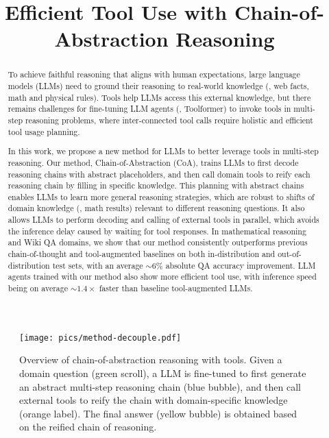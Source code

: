\title{Efficient Tool Use with Chain-of-Abstraction Reasoning}



\maketitle
\renewcommand{\thefootnote}{\fnsymbol{footnote}}
\renewcommand{\thefootnote}{\arabic{footnote}}
\begin{abstract}
To achieve faithful reasoning that aligns with human expectations, large language models (LLMs) need to ground their reasoning to real-world knowledge (\eg{}, web facts, math and physical rules).
Tools help LLMs access this external knowledge, but there remains challenges for fine-tuning LLM agents (\eg{}, Toolformer) to invoke tools in multi-step reasoning problems, where inter-connected tool calls require holistic and efficient tool usage planning.

In this work, we propose a new method for LLMs to better leverage tools in multi-step reasoning.
Our method, Chain-of-Abstraction (CoA), trains LLMs to first decode reasoning chains with abstract placeholders, and then call domain tools to reify each reasoning chain by filling in specific knowledge.
This planning with abstract chains enables LLMs to learn more general reasoning strategies, which are robust to shifts of domain knowledge (\eg{}, math results) relevant to different reasoning questions.
It also allows LLMs to perform decoding and calling of external tools in parallel, which avoids the inference delay caused by waiting for tool responses.
In mathematical reasoning and Wiki QA domains, we show that our method consistently outperforms previous chain-of-thought and tool-augmented baselines on both in-distribution and out-of-distribution test sets, with an average $\sim6\%$ absolute QA accuracy improvement.
LLM agents trained with our method also show more efficient tool use, with inference speed being on average $\sim$$1.4\times$ faster than baseline tool-augmented LLMs.
\end{abstract}

\begin{figure}[t]
\centering
\texttt{[image: pics/method-decouple.pdf]}
\caption{Overview of chain-of-abstraction reasoning with tools. Given a domain question (green scroll), a LLM is fine-tuned to first generate an abstract multi-step reasoning chain (blue bubble), and then call external tools to reify the chain with domain-specific knowledge (orange label). The final answer (yellow bubble) is obtained based on the reified chain of reasoning.}
\label{method_overview}
\end{figure}

